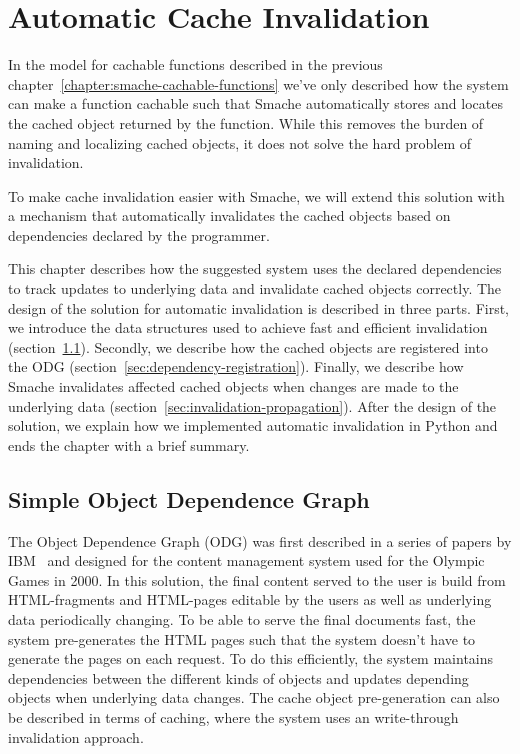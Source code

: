 \chapter{Automatic Cache Invalidation}
\label{chapter:invalidation}

In the model for cachable functions described in the previous chapter~\ref{chapter:smache-cachable-functions} we've only described how the system can make a function cachable such that Smache automatically stores and locates the cached object returned by the function. While this removes the burden of naming and localizing cached objects, it does not solve the hard problem of invalidation.

To make cache invalidation easier with Smache, we will extend this solution with a mechanism that automatically invalidates the cached objects based on dependencies declared by the programmer.

This chapter describes how the suggested system uses the declared dependencies to track updates to underlying data and invalidate cached objects correctly. The design of the solution for automatic invalidation is described in three parts. First, we introduce the data structures used to achieve fast and efficient invalidation (section~\ref{sec:simple-object-dependence-graph}). Secondly, we describe how the cached objects are registered into the ODG (section~\ref{sec:dependency-registration}). Finally, we describe how Smache invalidates affected cached objects when changes are made to the underlying data (section~\ref{sec:invalidation-propagation}). After the design of the solution, we explain how we implemented automatic invalidation in Python and ends the chapter with a brief summary.


\section{Simple Object Dependence Graph}
\label{sec:simple-object-dependence-graph}

The Object Dependence Graph (ODG) was first described in a series of papers by IBM~\cite{paper:ibm, paper:ibm-extended, paper:ibm-publishing-system} and designed for the content management system used for the Olympic Games in 2000. In this solution, the final content served to the user is build from HTML-fragments and HTML-pages editable by the users as well as underlying data periodically changing. To be able to serve the final documents fast, the system pre-generates the HTML pages such that the system doesn't have to generate the pages on each request. To do this efficiently, the system maintains dependencies between the different kinds of objects and updates depending objects when underlying data changes. The cache object pre-generation can also be described in terms of caching, where the system uses an write-through invalidation approach.

